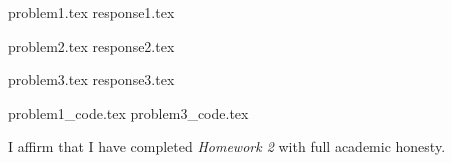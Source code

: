 \documentclass[letterpaper, 12pt]{article}
\begin{document}

{problem1.tex}
{response1.tex}

{problem2.tex}
{response2.tex}

{problem3.tex}
{response3.tex}

\appendix

{problem1_code.tex}
{problem3_code.tex}

\par

I affirm that I have completed \textit{Homework 2} with full academic honesty.
\end{document}
